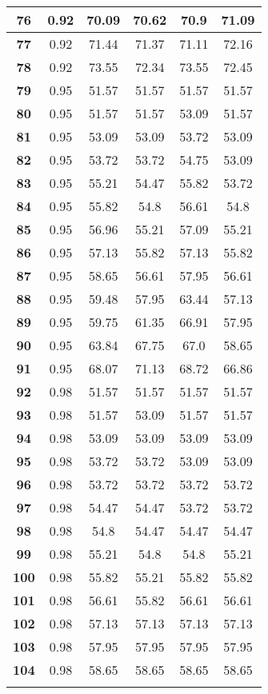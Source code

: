 \begin{longtable}{|c|c|c|c|c|c|}
\textbf{76} & 0.92 & 70.09 & 70.62 & 70.9 & 71.09 \\ \hline 
\textbf{77} & 0.92 & 71.44 & 71.37 & 71.11 & 72.16 \\ \hline 
\textbf{78} & 0.92 & 73.55 & 72.34 & 73.55 & 72.45 \\ \hline 
\textbf{79} & 0.95 & 51.57 & 51.57 & 51.57 & 51.57 \\ \hline 
\textbf{80} & 0.95 & 51.57 & 51.57 & 53.09 & 51.57 \\ \hline 
\textbf{81} & 0.95 & 53.09 & 53.09 & 53.72 & 53.09 \\ \hline 
\textbf{82} & 0.95 & 53.72 & 53.72 & 54.75 & 53.09 \\ \hline 
\textbf{83} & 0.95 & 55.21 & 54.47 & 55.82 & 53.72 \\ \hline 
\textbf{84} & 0.95 & 55.82 & 54.8 & 56.61 & 54.8 \\ \hline 
\textbf{85} & 0.95 & 56.96 & 55.21 & 57.09 & 55.21 \\ \hline 
\textbf{86} & 0.95 & 57.13 & 55.82 & 57.13 & 55.82 \\ \hline 
\textbf{87} & 0.95 & 58.65 & 56.61 & 57.95 & 56.61 \\ \hline 
\textbf{88} & 0.95 & 59.48 & 57.95 & 63.44 & 57.13 \\ \hline 
\textbf{89} & 0.95 & 59.75 & 61.35 & 66.91 & 57.95 \\ \hline 
\textbf{90} & 0.95 & 63.84 & 67.75 & 67.0 & 58.65 \\ \hline 
\textbf{91} & 0.95 & 68.07 & 71.13 & 68.72 & 66.86 \\ \hline 
\textbf{92} & 0.98 & 51.57 & 51.57 & 51.57 & 51.57 \\ \hline 
\textbf{93} & 0.98 & 51.57 & 53.09 & 51.57 & 51.57 \\ \hline 
\textbf{94} & 0.98 & 53.09 & 53.09 & 53.09 & 53.09 \\ \hline 
\textbf{95} & 0.98 & 53.72 & 53.72 & 53.09 & 53.09 \\ \hline 
\textbf{96} & 0.98 & 53.72 & 53.72 & 53.72 & 53.72 \\ \hline 
\textbf{97} & 0.98 & 54.47 & 54.47 & 53.72 & 53.72 \\ \hline 
\textbf{98} & 0.98 & 54.8 & 54.47 & 54.47 & 54.47 \\ \hline 
\textbf{99} & 0.98 & 55.21 & 54.8 & 54.8 & 55.21 \\ \hline 
\textbf{100} & 0.98 & 55.82 & 55.21 & 55.82 & 55.82 \\ \hline 
\textbf{101} & 0.98 & 56.61 & 55.82 & 56.61 & 56.61 \\ \hline 
\textbf{102} & 0.98 & 57.13 & 57.13 & 57.13 & 57.13 \\ \hline 
\textbf{103} & 0.98 & 57.95 & 57.95 & 57.95 & 57.95 \\ \hline 
\textbf{104} & 0.98 & 58.65 & 58.65 & 58.65 & 58.65 \\ \hline 

    \caption[]{}
    \label{Tab:}
\end{longtable}